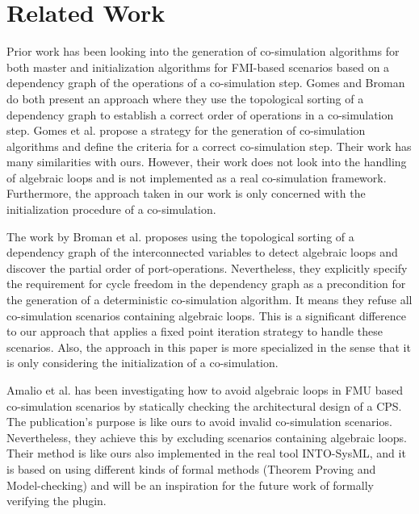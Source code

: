 \section{Related Work}
Prior work \cite{Gomes2019, BromanCompositionCo-Simulation} has been looking into the generation of co-simulation algorithms for both master and initialization algorithms for FMI-based scenarios based on a dependency graph of the operations of a co-simulation step. Gomes and Broman do both present an approach where they use the topological sorting of a dependency graph to establish a correct order of operations in a co-simulation step.
Gomes et al. \cite{Gomes2019} propose a strategy for the generation of co-simulation algorithms and define the criteria for a correct co-simulation step. Their work has many similarities with ours. However, their work does not look into the handling of algebraic loops and is not implemented as a real co-simulation framework. Furthermore, the approach taken in our work is only concerned with the initialization procedure of a co-simulation.

The work by Broman et al. \cite{BromanCompositionCo-Simulation} proposes using the topological sorting of a dependency graph of the interconnected variables to detect algebraic loops and discover the partial order of port-operations. Nevertheless, they explicitly specify the requirement for cycle freedom in the dependency graph as a precondition for the generation of a deterministic co-simulation algorithm. It means they refuse all co-simulation scenarios containing algebraic loops. This is a significant difference to our approach that applies a fixed point iteration strategy to handle these scenarios. Also, the approach in this paper is more specialized in the sense that it is only considering the initialization of a co-simulation. 

Amalio et al. \cite{Amalio2016CheckingCo-simulation} has been investigating how to avoid algebraic loops in FMU based co-simulation scenarios by statically checking the architectural design of a CPS. The publication's purpose is like ours to avoid invalid co-simulation scenarios. Nevertheless, they achieve this by excluding scenarios containing algebraic loops. Their method is like ours also implemented in the real tool INTO-SysML\cite{Miyazawa2016INtegratedModelling}, and it is based on using different kinds of formal methods (Theorem Proving and Model-checking) and will be an inspiration for the future work of formally verifying the plugin. 
